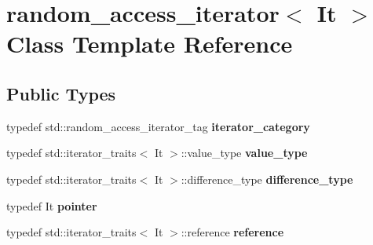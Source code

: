 \hypertarget{classrandom__access__iterator}{}\section{random\+\_\+access\+\_\+iterator$<$ It $>$ Class Template Reference}
\label{classrandom__access__iterator}
\subsection*{Public Types}
\begin{DoxyCompactItemize}
\item 
\mbox{\label{classrandom__access__iterator_a0e5ef7dd1925d9a9b600ad34c4c8f050}} 
typedef std\+::random\+\_\+access\+\_\+iterator\+\_\+tag {\bfseries iterator\+\_\+category}
\item 
\mbox{\label{classrandom__access__iterator_a355e43fddb2b732578d93a96290d67f6}} 
typedef std\+::iterator\+\_\+traits$<$ It $>$\+::value\+\_\+type {\bfseries value\+\_\+type}
\item 
\mbox{\label{classrandom__access__iterator_a3c019cfe832b77305647753c7fced48c}} 
typedef std\+::iterator\+\_\+traits$<$ It $>$\+::difference\+\_\+type {\bfseries difference\+\_\+type}
\item 
\mbox{\label{classrandom__access__iterator_ab4de097ed871afe7c5ba398accf82376}} 
typedef It {\bfseries pointer}
\item 
\mbox{\label{classrandom__access__iterator_abb86aa8ff1d1bf2a8dd47fc024b52c03}} 
typedef std\+::iterator\+\_\+traits$<$ It $>$\+::reference {\bfseries reference}
\end{DoxyCompactItemize}
